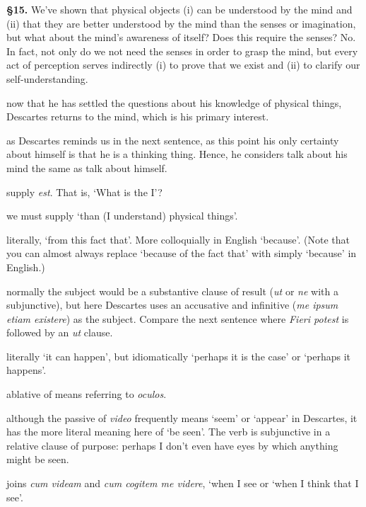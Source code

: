 \prenotes

\textbf{§15.} We've shown that physical objects (i) can be understood by the mind and (ii) that they are better understood by the mind than the senses or imagination, but what about the mind's awareness of itself? Does this require the senses? No. In fact, not only do we not need the senses in order to grasp the mind, but every act of perception serves indirectly (i) to prove that we exist and (ii) to clarify our self-understanding.

 now that he has settled the questions about his knowledge of physical things, Descartes returns to the mind, which is his primary interest.

 as Descartes reminds us in the next sentence, as this point his only certainty about himself is that he is a thinking thing. Hence, he considers talk about his mind the same as talk about himself.

 supply \textit{est}. That is, `What is the I'?

 we must supply `than (I understand) physical things'.

 literally, `from this fact that'. More colloquially in English `because'. (Note that you can almost always replace `because of the fact that' with simply `because' in English.)

 normally the subject would be a substantive clause of result (\textit{ut} or \textit{ne} with a subjunctive), but here Descartes uses an accusative and infinitive (\textit{me ipsum etiam existere}) as the subject. Compare the next sentence where \textit{Fieri potest} is followed by an \textit{ut} clause.

 literally `it can happen', but idiomatically `perhaps it is the case' or `perhaps it happens'.

 ablative of means referring to \textit{oculos}.

 although the passive of \textit{video} frequently means `seem' or `appear' in Descartes, it has the more literal meaning here of `be seen'. The verb is subjunctive in a relative clause of purpose: perhaps I don't even have eyes by which anything might be seen.

 joins \textit{cum videam} and \textit{cum cogitem me videre}, `when I see or `when I think that I see'.

